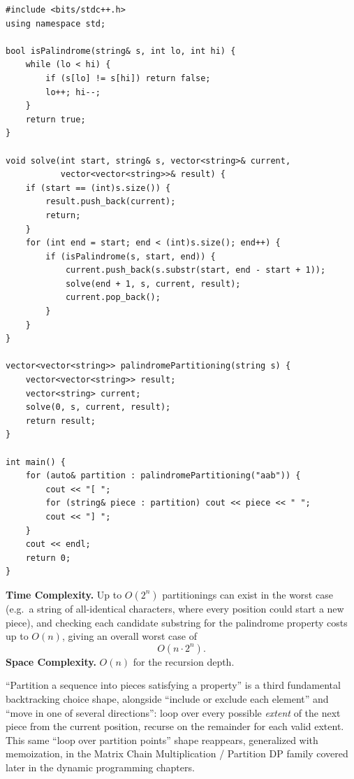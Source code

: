 \begin{lstlisting}
#include <bits/stdc++.h>
using namespace std;

bool isPalindrome(string& s, int lo, int hi) {
    while (lo < hi) {
        if (s[lo] != s[hi]) return false;
        lo++; hi--;
    }
    return true;
}

void solve(int start, string& s, vector<string>& current,
           vector<vector<string>>& result) {
    if (start == (int)s.size()) {
        result.push_back(current);
        return;
    }
    for (int end = start; end < (int)s.size(); end++) {
        if (isPalindrome(s, start, end)) {
            current.push_back(s.substr(start, end - start + 1));
            solve(end + 1, s, current, result);
            current.pop_back();
        }
    }
}

vector<vector<string>> palindromePartitioning(string s) {
    vector<vector<string>> result;
    vector<string> current;
    solve(0, s, current, result);
    return result;
}

int main() {
    for (auto& partition : palindromePartitioning("aab")) {
        cout << "[ ";
        for (string& piece : partition) cout << piece << " ";
        cout << "] ";
    }
    cout << endl;
    return 0;
}
\end{lstlisting}

\begin{complexitybox}
\textbf{Time Complexity.} Up to $O(2^n)$ partitionings can exist in the
worst case (e.g.\ a string of all-identical characters, where every
position could start a new piece), and checking each candidate substring
for the palindrome property costs up to $O(n)$, giving an overall worst
case of
\[
  O(n \cdot 2^n).
\]
\textbf{Space Complexity.} $O(n)$ for the recursion depth.
\end{complexitybox}

\begin{takeawaybox}
``Partition a sequence into pieces satisfying a property'' is a third
fundamental backtracking choice shape, alongside ``include or exclude
each element'' and ``move in one of several directions'': loop over
every possible \emph{extent} of the next piece from the current
position, recurse on the remainder for each valid extent. This same
``loop over partition points'' shape reappears, generalized with memoization,
in the Matrix Chain Multiplication / Partition DP family covered later in
the dynamic programming chapters.
\end{takeawaybox}
